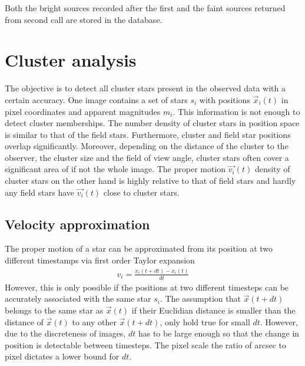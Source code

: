 \documentclass[letterpaper,10pt,english]{sphinxmanual}
\begin{document}
\sphinxAtStartPar
Both the bright sources recorded after the first and the faint sources returned from second call are stored in the database.


\chapter{Cluster analysis}
\label{\detokenize{NBodySimulation/Clustering:cluster-analysis}}\label{\detokenize{NBodySimulation/Clustering::doc}}
\sphinxAtStartPar
The objective is to detect all cluster stars present in the observed data with a certain accuracy.
One image contains a set of stars \(s_{i}\) with positions \(\vec{x}_{i}\left ( t \right )\) in pixel coordinates and apparent magnitudes \(m_{i}\).
This information is not enough to detect cluster memberships. The number density of cluster stars in position space is similar to that of the field stars.
Furthermore, cluster and field star positions overlap significantly.
Moreover, depending on the distance of the cluster to the observer, the cluster size and the field of view angle, cluster stars often cover a significant area of if not the whole image.
The proper motion \(\vec{v_{i}}(t)\) density of cluster stars on the other hand is highly relative to that of field stars and hardly any field stars have \(\vec{v_{i}}(t)\) close to cluster stars.


\section{Velocity approximation}
\label{\detokenize{NBodySimulation/Clustering:velocity-approximation}}
\sphinxAtStartPar
The proper motion of a star can be approximated from its position at two different timestamps via first order Taylor expansion
\begin{equation*}
\begin{split}v_{i} = \frac{x_{i}\left ( t+dt \right )-x_{i}\left ( t \right )}{dt}\end{split}
\end{equation*}
\sphinxAtStartPar
However, this is only possible if the positions at two different timesteps can be accurately associated with the same star \(s_{i}\).
The assumption that \(\vec{x}(t+dt)\) belongs to the same star as \(\vec{x}(t)\) if their Euclidian distance is smaller than the distance of \(\vec{x}(t)\) to any other \(\vec{x}(t+dt)\),
only hold true for small \(dt\). However, due to the discreteness of images, \(dt\) has to be large enough so that the change in position is detectable between timesteps.
The pixel scale \sphinxhyphen{} the ratio of arcsec to pixel \sphinxhyphen{} dictates a lower bound for \(dt\).
\end{document}
